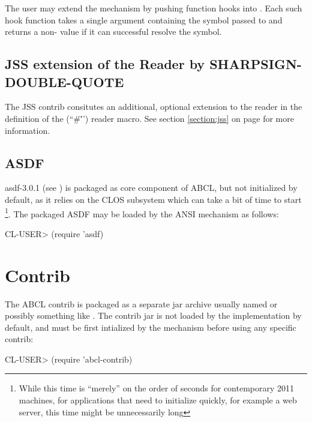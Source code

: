 \documentclass[10pt]{book}
\begin{document}
The user may extend the  mechanism by pushing
function hooks into .  Each
such hook function takes a single argument containing the symbol
passed to  and returns a non- value if it
can successful resolve the symbol.

\section{JSS extension of the Reader by SHARPSIGN-DOUBLE-QUOTE}

The JSS contrib consitutes an additional, optional extension to the
reader in the definition of the 
(``\#\"'') reader macro.  See section \ref{section:jss} on page
\pageref{section:jss} for more information.

\section{ASDF}

asdf-3.0.1 (see \cite{asdf}) is packaged as core component of \textsc{ABCL},
but not initialized by default, as it relies on the \textsc{CLOS} subsystem
which can take a bit of time to start \footnote{While this time is
  ``merely'' on the order of seconds for contemporary 2011 machines,
  for applications that need to initialize quickly, for example a web
  server, this time might be unnecessarily long}.  The packaged \textsc{ASDF}
may be loaded by the \textsc{ANSI}  mechanism as
follows:

\begin{listing-lisp}
CL-USER> (require 'asdf)
\end{listing-lisp}

\chapter{Contrib}

The \textsc{ABCL} contrib is packaged as a separate jar archive usually named
 or possibly something like
.  The contrib jar is not loaded by the
implementation by default, and must be first intialized by the
 mechanism before using any specific contrib:

\begin{listing-lisp}
CL-USER> (require 'abcl-contrib)
\end{listing-lisp}
\end{document}
